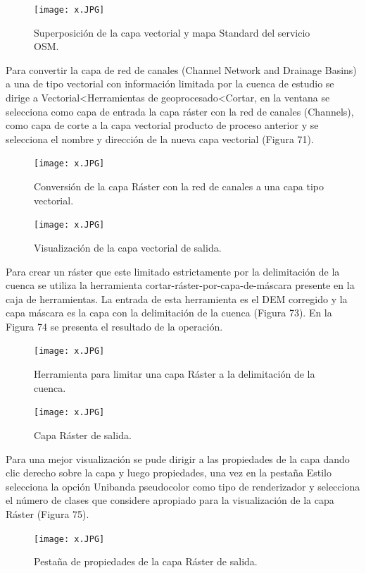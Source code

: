 \documentclass[12pt,hidelinks]{article}
\begin{document}
\begin{figure}[H]
    \centering
    \texttt{[image: x.JPG]}
    \caption{Superposición de la capa vectorial y mapa Standard del servicio OSM. }
 \label{fig:my_label}
\end{figure}
Para convertir la capa de red de canales (Channel Network and Drainage Basins) a una de tipo vectorial con información limitada por la cuenca de estudio se dirige a Vectorial<Herramientas de geoprocesado<Cortar, en la ventana se selecciona como capa de entrada la capa ráster con la red de canales (Channels), como capa de corte a la capa vectorial producto de proceso anterior y se selecciona el nombre y dirección de la nueva capa vectorial (Figura 71).
\begin{figure}[H]
    \centering
    \texttt{[image: x.JPG]}
    \caption{Conversión de la capa Ráster con la red de canales a una capa tipo vectorial. }
 \label{fig:my_label}
\end{figure}
\begin{figure}[H]
    \centering
    \texttt{[image: x.JPG]}
    \caption{Visualización de la capa vectorial de salida. }
 \label{fig:my_label}
\end{figure}
Para crear un ráster que este limitado estrictamente por la delimitación de la cuenca se utiliza la herramienta cortar-ráster-por-capa-de-máscara presente en la caja de herramientas. La entrada de esta herramienta es el DEM corregido y la capa máscara es la capa con la delimitación de la cuenca (Figura 73). En la Figura 74 se presenta el resultado de la operación.
\begin{figure}[H]
    \centering
    \texttt{[image: x.JPG]}
    \caption{Herramienta para limitar una capa Ráster a la delimitación de la cuenca. }
 \label{fig:my_label}
\end{figure}
\begin{figure}[H]
    \centering
    \texttt{[image: x.JPG]}
    \caption{Capa Ráster de salida. }
 \label{fig:my_label}
\end{figure}
Para una mejor visualización se pude dirigir a las propiedades de la capa dando clic derecho sobre la capa y luego propiedades, una vez en la pestaña Estilo selecciona la opción Unibanda pseudocolor como tipo de renderizador y selecciona el número de clases que considere apropiado para la visualización de la capa Ráster (Figura 75).
\begin{figure}[H]
    \centering
    \texttt{[image: x.JPG]}
    \caption{Pestaña de propiedades de la capa Ráster de salida. }
 \label{fig:my_label}
\end{figure}
\end{document}
